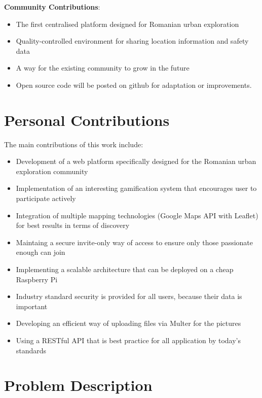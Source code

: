 \documentclass[12pt,a4paper]{report}
\begin{document}
\textbf{Community Contributions}:
\begin{itemize}
    \item The first centralised platform designed for Romanian urban exploration
    \item Quality-controlled environment for sharing location information and safety data
    \item A way for the existing community to grow in the future
    \item Open source code will be posted on github for adaptation or improvements.
\end{itemize}

\newpage

\chapter*{Personal Contributions}

The main contributions of this work include:

\begin{itemize}
    \item Development of a web platform specifically designed for the Romanian urban exploration community
    \item Implementation of an interesting gamification system that encourages user to participate actively
    \item Integration of multiple mapping technologies (Google Maps API with Leaflet) for best results in terms of discovery
    \item Maintaing a secure invite-only way of access to ensure only those passionate enough can join
    \item Implementing a scalable architecture that can be deployed on a cheap Raspberry Pi
    \item Industry standard security is provided for all users, because their data is important
    \item Developing an efficient way of uploading files via Multer for the pictures
    \item Using a RESTful API that is best practice for all application by today's standards
\end{itemize}

\newpage

\chapter{Problem Description}
\end{document}
